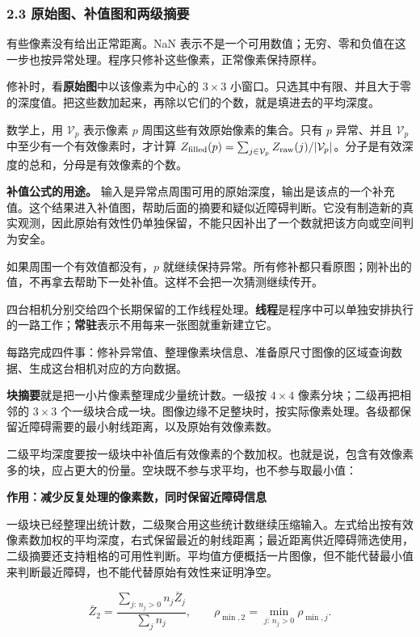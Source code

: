 \documentclass[12pt,a4paper]{article}
\numberwithin{equation}{topic}
\begin{document}
\subsubsection*{2.3 原始图、补值图和两级摘要}

有些像素没有给出正常距离。NaN 表示不是一个可用数值；无穷、零和负值在这一步也按异常处理。程序只修补这些像素，正常像素保持原样。

修补时，看\textbf{原始图}中以该像素为中心的 \(3\times3\) 小窗口。只选其中有限、并且大于零的深度值。把这些数加起来，再除以它们的个数，就是填进去的平均深度。

数学上，用 \(\mathcal V_p\) 表示像素 \(p\) 周围这些有效原始像素的集合。只有 \(p\) 异常、并且 \(\mathcal V_p\) 中至少有一个有效像素时，才计算 \(Z_{\rm filled}(p)=\sum_{j\in\mathcal V_p} Z_{\rm raw}(j)/|\mathcal V_p|\)。分子是有效深度的总和，分母是有效像素的个数。

\textbf{补值公式的用途。} 输入是异常点周围可用的原始深度，输出是该点的一个补充值。这个结果进入补值图，帮助后面的摘要和疑似近障碍判断。它没有制造新的真实观测，因此原始有效性仍单独保留，不能只因补出了一个数就把该方向或空间判为安全。

如果周围一个有效值都没有，\(p\) 就继续保持异常。所有修补都只看原图；刚补出的值，不再拿去帮助下一处补值。这样不会把一次猜测继续传开。

四台相机分别交给四个长期保留的工作线程处理。\textbf{线程}是程序中可以单独安排执行的一路工作；\textbf{常驻}表示不用每来一张图就重新建立它。

每路完成四件事：修补异常值、整理像素块信息、准备原尺寸图像的区域查询数据、生成这台相机对应的方向数据。

\textbf{块摘要}就是把一小片像素整理成少量统计数。一级按 \(4\times4\) 像素分块；二级再把相邻的 \(3\times3\) 个一级块合成一块。图像边缘不足整块时，按实际像素处理。各级都保留近障碍需要的最小射线距离，以及原始有效像素数。

二级平均深度要按一级块中补值后有效像素的个数加权。也就是说，包含有效像素多的块，应占更大的份量。空块既不参与求平均，也不参与取最小值：

\noindent\textbf{作用：减少反复处理的像素数，同时保留近障碍信息}\par\nobreak
一级块已经整理出统计数，二级聚合用这些统计数继续压缩输入。左式给出按有效像素数加权的平均深度，右式保留最近的射线距离；最近距离供近障碍筛选使用，二级摘要还支持粗格的可用性判断。平均值方便概括一片图像，但不能代替最小值来判断最近障碍，也不能代替原始有效性来证明净空。

\begin{equation}
\label{eq:pool}
\bar Z_2=\frac{\sum_{j:\,n_j>0} n_j\bar Z_j}{\sum_j n_j},
\qquad
\rho_{\min,2}=\min_{j:\,n_j>0}\rho_{\min,j}.
\end{equation}
\end{document}

